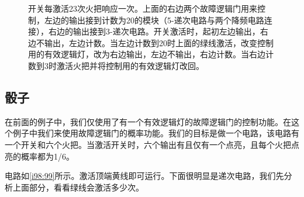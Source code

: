 \begin{figure}[!ht]
\begin{center}
\qquad
{}
\end{center}
\caption{开关每激活23次火把响应一次。上面的右边两个故障逻辑门用来控制，左边的输出接到计数为20的模块（5-递次电路与两个降频电路连接），右边的输出接到3-递次电路。开关激活时，起初左边输出，右边不输出，左边计数。当左边计数到20时上面的绿线激活，改变控制用的有效逻辑灯，改为右边输出，左边不输出，右边计数。当右边计数到3时激活火把并将控制用的有效逻辑灯改回。}
\label{i231:232}
\end{figure}

\subsection{骰子}

在前面的例子中，我们仅使用了有一个有效逻辑灯的故障逻辑门的控制功能。在这个例子中我们来使用故障逻辑门的概率功能。我们的目标是做一个电路，该电路有一个开关和六个火把。当激活开关时，六个输出有且仅有一个点亮，且每个火把点亮的概率都为1/6。

电路如\autoref{i98:99}所示。激活顶端黄线即可运行。下面很明显是递次电路，我们先分析上面部分，看看绿线会激活多少次。

